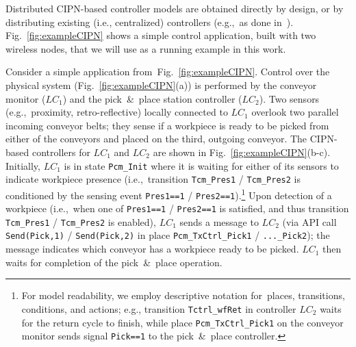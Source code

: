 Distributed CIPN-based controller models are obtained directly by design, or by distributing existing  (i.e., centralized) controllers %
(e.g.,~as done in~\cite{jakovljevic_tcst19}). %
%
Fig.~\ref{fig:exampleCIPN} shows a simple control application, built with two wireless nodes, that we will use as a %
running example in this work. %



\begin{example}
\label{ex:motivation}
Consider a simple application from~Fig.~\ref{fig:exampleCIPN}.
Control over the physical system (Fig.~\ref{fig:exampleCIPN}(a)) is performed by the conveyor monitor ($LC_1$) and the pick~\&~place station controller ($LC_2$). Two sensors (e.g.,~proximity, retro-reflective) locally connected to $LC_1$ overlook two parallel incoming conveyor belts; they sense if a workpiece is ready to be picked from either of the conveyors %
and placed on the third, outgoing conveyor.
The CIPN-based controllers %
for $LC_1$ and $LC_2$ are shown in Fig.~\ref{fig:exampleCIPN}(b-c).
Initially, $LC_1$ is in state \verb!Pcm_Init! where it is waiting for either of %
its sensors to indicate workpiece presence (i.e.,~transition \verb!Tcm_Pres1! / \verb!Tcm_Pres2! is conditioned by the sensing event \verb!Pres1==1! / \verb!Pres2==1!).\footnote{For model readability, we employ descriptive notation for~places, transitions, conditions, and actions; e.g., transition \verb!Tctrl_wfRet! in controller $LC_2$ waits for the return cycle to finish, while place \verb+Pcm_TxCtrl_Pick1+ on the conveyor monitor sends signal \verb+Pick==1+ to the pick~\&~place controller.} Upon detection of a workpiece (i.e.,~when one of %
\verb!Pres1==1! / \verb!Pres2==1! is satisfied, and thus transition \verb!Tcm_Pres1! / \verb!Tcm_Pres2! is enabled), $LC_1$ sends a message to $LC_2$ %
(via API call \verb!Send(Pick,1)! / \verb!Send(Pick,2)! in place \verb!Pcm_TxCtrl_Pick1! / \verb!..._Pick2!); %
the message %
indicates which conveyor has a workpiece ready to be picked. $LC_1$ then waits for completion of the pick~\&~place operation.


\end{example}
